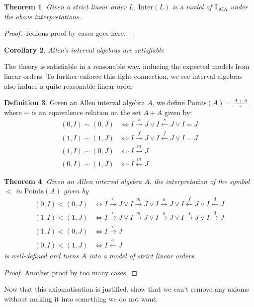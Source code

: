 \documentclass[11pt %
              ]{article}
\newcommand{\theory}{\mathbb{T}}
\newcommand{\taia}{\theory_\text{AIA}}
\newcommand{\inter}[1]{\text{Inter}\left(#1\right)}
\newcommand{\points}[1]{\text{Points}\left(#1\right)}
\newcommand{\before}{\overset{<}{\longrightarrow}}
\newcommand{\meets}{\overset{m}{\longrightarrow}}
\newcommand{\overlaps}{\overset{o}{\longrightarrow}}
\newcommand{\starts}{\overset{s}{\longrightarrow}}
\newcommand{\finishes}{\overset{f}{\longrightarrow}}
\newcommand{\contained}{\overset{d}{\longrightarrow}}
\newcommand{\after}{\overset{<}{\longleftarrow}}
\newcommand{\metby}{\overset{m}{\longleftarrow}}
\newcommand{\startedby}{\overset{s}{\longleftarrow}}
\newcommand{\finishedby}{\overset{f}{\longleftarrow}}
\newcommand{\contains}{\overset{d}{\longleftarrow}}
\theoremstyle{plain}
\newtheorem{thm}{Theorem}%
\newtheorem{cor}[thm]{Corollary}
\theoremstyle{definition}
\newtheorem{defn}[thm]{Definition}
\theoremstyle{remark}
\begin{document}
\begin{thm}
  Given a strict linear order $L$, $\inter{L}$ is a model of $\taia$ under the above
  interpretations.
\end{thm}
\begin{proof}
  Tedious proof by cases goes here.
\end{proof}

\begin{cor}
  Allen's interval algebras are satisfiable
\end{cor}

The theory is satisfiable in a reasonable way, inducing the expected models from linear orders.
To further enforce this tight connection, we see interval algebras also induce a quite reasonable
linear order

\begin{defn}
  Given an Allen interval algebra $A$, we define $\points{A} = \frac{A + A}{\sim}$ where
  $\sim$ is an equivalence relation on the set $A + A$ given by:
  \begin{align*}
    (0,I) \sim (0,J) & \iff I \starts J \lor I \startedby J \lor I = J \\
    (1,I) \sim (1,J) & \iff I \finishes J \lor I \finishedby J \lor I = J \\
    (1,I) \sim (0,J) & \iff I \meets J \\
    (0,I) \sim (1,J) & \iff I \metby J
  \end{align*}
\end{defn}

\begin{thm}
  Given an Allen interval algebra $A$, the interpretation of the symbol $<$ in $\points{A}$ given by
  \begin{align*}
    (0,I) < (0,J) & \iff I \before J \lor I \meets J \lor I \overlaps J 
      \lor I \finishedby J \lor I \contains J \\
    (1,I) < (1,J) & \iff I \before J \lor I \meets J \lor I \overlaps J
      \lor I \starts J \lor I \contained J \\
    (1,I) < (0,J) & \iff I \before J \\
    (0,I) < (1,J) & \iff I \after J
  \end{align*}
  is well-defined and turns $A$ into a model of strict linear orders.
\end{thm}
\begin{proof}
  Another proof by too many cases.
\end{proof}

Now that this axiomatisation is justified, show that we can't remove any axioms without making
it into something we do not want.
\end{document}
